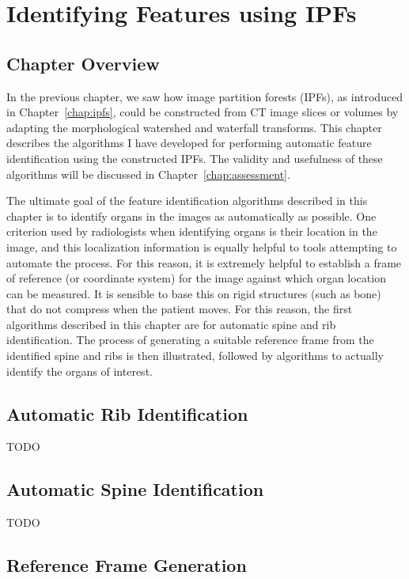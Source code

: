 \chapter{Identifying Features using IPFs}
\label{chap:featureid}

\section{Chapter Overview}

In the previous chapter, we saw how image partition forests (IPFs), as introduced in Chapter~\ref{chap:ipfs}, could be constructed from CT image slices or volumes by adapting the morphological watershed and waterfall transforms. This chapter describes the algorithms I have developed for performing automatic feature identification using the constructed IPFs. The validity and usefulness of these algorithms will be discussed in Chapter~\ref{chap:assessment}.

The ultimate goal of the feature identification algorithms described in this chapter is to identify organs in the images as automatically as possible. One criterion used by radiologists \cite{?} when identifying organs is their location in the image, and this localization information is equally helpful to tools attempting to automate the process. For this reason, it is extremely helpful to establish a frame of reference (or coordinate system) for the image against which organ location can be measured. It is sensible to base this on rigid structures (such as bone) that do not compress when the patient moves. For this reason, the first algorithms described in this chapter are for automatic spine and rib identification. The process of generating a suitable reference frame from the identified spine and ribs is then illustrated, followed by algorithms to actually identify the organs of interest.

\section{Automatic Rib Identification}

TODO

\section{Automatic Spine Identification}

TODO

\section{Reference Frame Generation}

